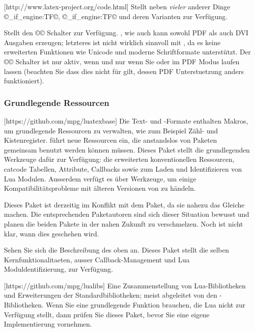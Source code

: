 \documentclass{lltxdoc}
\begin{document}
[http://www.latex-project.org/code.html]
Stellt neben \emph{vieler} anderer Dinge ©\luatex_if_engine:TF©,
©\xetex_if_engine:TF© und deren Varianten zur Verfügung.

Stellt den ©\ifpdf© Schalter zur Verfügung. \luatex, wie auch \pdftex kann 
sowohl PDF als auch DVI Ausgaben erzeugen; letzteres ist nicht wirklich sinnvoll
 mit \luatex, da es keine erweiterten Funktionen wie Unicode und moderne 
Schriftformate unterstützt. Der ©\ifpdf© Schalter ist nur aktiv, wenn und nur 
wenn Sie \pdftex oder \luatex im PDF Modus laufen lassen (beachten Sie dass dies
 nicht für \xetex gilt, dessen PDF Unterstuetzung anders funktioniert).


\subsubsection{Grundlegende Ressourcen}

[https://github.com/mpg/luatexbase]
Die Text- und \latex-Formate enthalten Makros, um grundlegende \tex Ressourcen 
zu verwalten, wie zum Beispiel Zähl- und Kistenregister. \luatex führt neue 
Ressourcen ein, die anstandslos von Paketen gemeinsam benutzt werden können 
müssen. Dieses Paket stellt die grundlegenden Werkzeuge dafür zur Verfügung: 
die erweiterten konventionellen \tex Ressourcen, catcode Tabellen, Attribute, 
Callbacks sowie zum Laden und Identifizieren von Lua Modulen. Ausserdem verfügt 
es über Werkzeuge, um einige Kompatibilitätsprobleme mit älteren Versionen von 
\luatex zu händeln.

 Dieses Paket ist derzeitig im Konflikt mit dem  Paket,
 da sie nahezu das Gleiche machen. Die entsprechenden Paketautoren sind sich 
dieser Situation bewusst und planen die beiden Pakete in der nahen Zukunft zu 
verschmelzen. Noch ist nicht klar, wann dies geschehen wird.

Sehen Sie sich die Beschreibung des oben an. Dieses Paket stellt die selben 
Kernfunktionalitaeten, ausser Callback-Management und Lua Moduldentifizierung, 
zur Verfügung.

[https://github.com/mpg/lualibs]
Eine Zusammenstellung von Lua-Bibliotheken und Erweiterungen der 
Standardbibliotheken; meist abgeleitet von den \context-Bibliotheken. Wenn Sie 
eine grundlegende Funktion brauchen, die Lua nicht zur Verfügung stellt, dann 
prüfen Sie dieses Paket, bevor Sie eine eigene Implementierung vornehmen.
\end{document}
